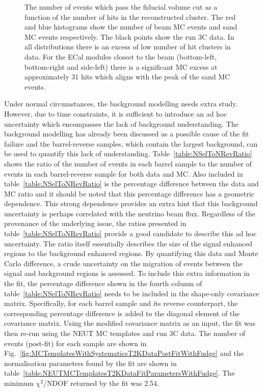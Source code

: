\begin{figure}
\begin{minipage}{.5\linewidth}
\end{minipage}\par\medskip
\caption{The number of events which pass the fiducial volume cut as a function of the number of hits in the reconstructed cluster.  The red and blue histograms show the number of beam MC events and sand MC events respectively.  The black points show the run 3C data.  In all distributions there is an excess of low number of hit clusters in data.  For the ECal modules closest to the beam (bottom-left, bottom-right and side-left) there is a significant MC excess at approximately 31 hits which aligns with the peak of the sand MC events.}
\label{fig:ClusterNHitsCutLevelGT0}
\end{figure}
\newline
\newline
Under normal circumstances, the background modelling needs extra study.  However, due to time constraints, it is sufficient to introduce an ad hoc uncertainty which encompasses the lack of background understanding.  The background modelling has already been discussed as a possible cause of the fit failure and the barrel-reverse samples, which contain the largest background, can be used to quantify this lack of understanding.  Table~\ref{table:NSelToNRevRatio} shows the ratio of the number of events in each barrel sample to the number of events in each barrel-reverse sample for both data and MC.  Also included in table~\ref{table:NSelToNRevRatio} is the percentage difference between the data and MC ratio and it should be noted that this percentage difference has a geometric dependence.  This strong dependence provides an extra hint that this background uncertainty is perhaps correlated with the neutrino beam flux.  Regardless of the provenance of the underlying issue, the ratios presented in table~\ref{table:NSelToNRevRatio} provide a good candidate to describe this ad hoc uncertainty.  The ratio itself essentially describes the size of the signal enhanced regions to the background enhanced regions.  By quantifying this data and Monte Carlo difference, a crude uncertainty on the migration of events between the signal and background regions is  assessed.  To include this extra information in the fit, the percentage difference shown in the fourth column of table~\ref{table:NSelToNRevRatio} needs to be included in the shape-only covariance matrix.  Specifically, for each barrel sample and its reverse counterpart, the corresponding percentage difference is added to the diagonal element of the covariance matrix.  Using the modified covariance matrix as an input, the fit was then re-run using the NEUT MC templates and run 3C data.  The number of events (post-fit) for each sample are shown in Fig.~\ref{fig:MCTemplatesWithSystematicsT2KDataPostFitWithFudge} and the normalisation parameters found by the fit are shown in table~\ref{table:NEUTMCTemplatesT2KDataFitParametersWithFudge}.  The minimum $\chi^2$/NDOF returned by the fit was 2.54.
